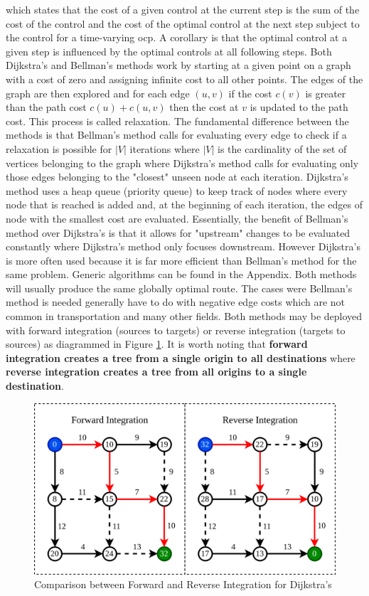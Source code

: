 \documentclass[12pt]{article}
\begin{document}
which states that the cost of a given control at the current step is the sum of the cost of the control and the cost of the optimal control at the next step subject to the control for a time-varying \gls{ocp}. A corollary is that the optimal control at a given step is influenced by the optimal controls at all following steps. Both Dijkstra's and Bellman's methods work by starting at a given point on a graph with a cost of zero and assigning infinite cost to all other points. The edges of the graph are then explored and for each edge $(u, v)$ if the cost $c(v)$ is greater than the path cost $c(u) + c(u, v)$ then the cost at $v$ is updated to the path cost. This process is called relaxation. The fundamental difference between the methods is that Bellman's method calls for evaluating every edge to check if a relaxation is possible for $|V|$ iterations where $|V|$ is the cardinality of the set of vertices belonging to the graph where Dijkstra's method calls for evaluating only those edges belonging to the "closest" unseen node at each iteration. Dijkstra's method uses a heap queue (priority queue) to keep track of nodes where every node that is reached is added and, at the beginning of each iteration, the edges of node with the smallest cost are evaluated. Essentially, the benefit of Bellman's method over Dijkstra's is that it allows for "upstream" changes to be evaluated constantly where Dijkstra's method only focuses downstream. However Dijkstra's is more often used because it is far more efficient than Bellman's method for the same problem. Generic algorithms can be found in the Appendix. Both methods will usually produce the same globally optimal route. The cases were Bellman's method is needed generally have to do with negative edge costs which are not common in transportation and many other fields. Both methods may be deployed with forward integration (sources to targets) or reverse integration (targets to sources) as diagrammed in Figure \ref{fig:dijkstra}. It is worth noting that \textbf{forward integration creates a tree from a single origin to all destinations} where \textbf{reverse integration creates a tree from all origins to a single destination}. 

\begin{figure}[H]
	\centering
	\includegraphics[width = \linewidth]{figs/routing_diagram.png}
	\caption{Comparison between Forward and Reverse Integration for Dijkstra's}
	\label{fig:dijkstra}
\end{figure}
\end{document}
